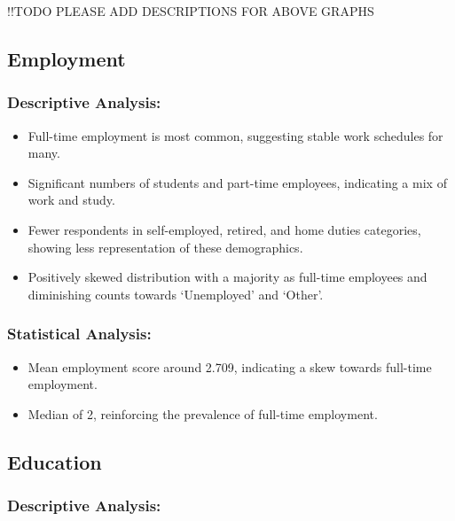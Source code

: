 \documentclass[
]{article}
\providecommand{\tightlist}{%
  \setlength{\itemsep}{0pt}\setlength{\parskip}{0pt}}
\begin{document}
!!TODO PLEASE ADD DESCRIPTIONS FOR ABOVE GRAPHS

\hypertarget{employment}{%
\subsection{Employment}\label{employment}}

\hypertarget{descriptive-analysis}{%
\subsubsection{Descriptive Analysis:}\label{descriptive-analysis}}

\begin{itemize}
\tightlist
\item
  Full-time employment is most common, suggesting stable work schedules
  for many.
\item
  Significant numbers of students and part-time employees, indicating a
  mix of work and study.
\item
  Fewer respondents in self-employed, retired, and home duties
  categories, showing less representation of these demographics.
\item
  Positively skewed distribution with a majority as full-time employees
  and diminishing counts towards `Unemployed' and `Other'.
\end{itemize}

\hypertarget{statistical-analysis}{%
\subsubsection{Statistical Analysis:}\label{statistical-analysis}}

\begin{itemize}
\tightlist
\item
  Mean employment score around 2.709, indicating a skew towards
  full-time employment.
\item
  Median of 2, reinforcing the prevalence of full-time employment.
\end{itemize}

\hypertarget{education}{%
\subsection{Education}\label{education}}

\hypertarget{descriptive-analysis-1}{%
\subsubsection{Descriptive Analysis:}\label{descriptive-analysis-1}}
\end{document}

